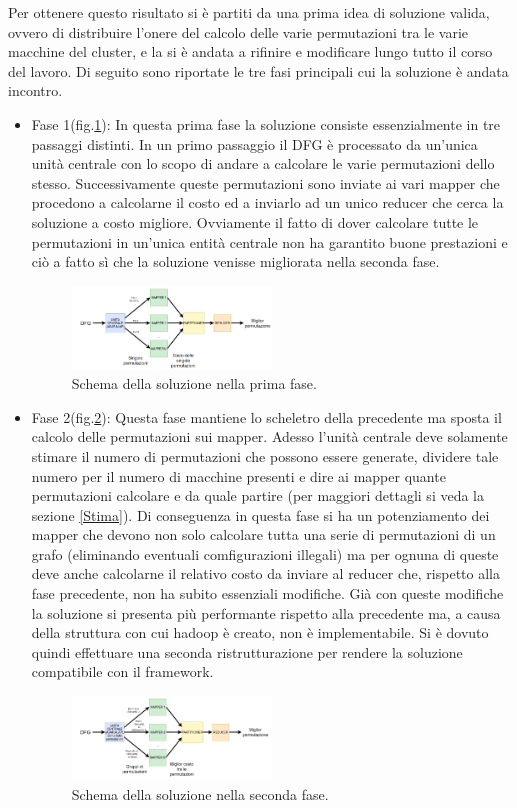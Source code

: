 \documentclass[]{IEEEtran}
\begin{document}
Per ottenere questo risultato si è partiti da una prima idea di soluzione valida, ovvero di distribuire l'onere del calcolo delle varie permutazioni tra le varie macchine del cluster, e la si è andata a rifinire e modificare lungo tutto il corso del lavoro. Di seguito sono riportate le tre fasi principali cui la soluzione è andata incontro.
\begin{itemize}
	\item Fase 1(fig.\ref{sol_fase1}): In questa prima fase la soluzione consiste essenzialmente in tre passaggi distinti. In un primo passaggio il DFG è processato da un'unica unità centrale con lo scopo di andare a calcolare le varie permutazioni dello stesso. Successivamente queste permutazioni sono inviate ai vari mapper che procedono a calcolarne il costo ed a inviarlo ad un unico reducer che cerca la soluzione a costo migliore. Ovviamente il fatto di dover calcolare tutte le permutazioni in un'unica entità centrale non ha garantito buone prestazioni e ciò a fatto sì che la soluzione venisse migliorata nella seconda fase.
	\begin{figure}[htp]
		\includegraphics[width=0.5\textwidth]{images/sol_fase1.png}
		\caption{Schema della soluzione nella prima fase.}
		\label{sol_fase1}
	\end{figure}
	
	\item Fase 2(fig.\ref{sol_fase2}): Questa fase mantiene lo scheletro della precedente ma sposta il calcolo delle permutazioni sui mapper. Adesso l'unità centrale deve solamente stimare il numero di permutazioni che possono essere generate, dividere tale numero per il numero di macchine presenti e dire ai mapper quante permutazioni calcolare e da quale partire (per maggiori dettagli si veda la sezione \ref{Stima}). Di conseguenza in questa fase si ha un potenziamento dei mapper che devono non solo calcolare tutta una serie di permutazioni di un grafo (eliminando eventuali comfigurazioni illegali) ma per ognuna di queste deve anche calcolarne il relativo costo da inviare al reducer che, rispetto alla fase precedente, non ha subito essenziali modifiche. Già con queste modifiche la soluzione si presenta più performante rispetto alla precedente ma, a causa della struttura con cui hadoop è creato, non è implementabile. Si è dovuto quindi effettuare una seconda ristrutturazione per rendere la soluzione compatibile con il framework.
	\begin{figure}[htp]
		\includegraphics[width=0.5\textwidth]{images/sol_fase2.png}
		\caption{Schema della soluzione nella seconda fase.}
		\label{sol_fase2}
	\end{figure}
	

\end{itemize}
\end{document}
